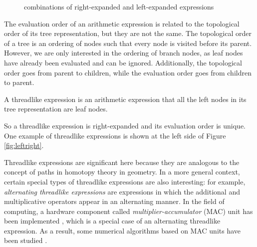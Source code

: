 \begin{figure}[ht]
\centering
{}
\caption{combinations of right-expanded and left-expanded expressions}\label{fig:combination}
\end{figure}

The evaluation order of an arithmetic expression is related to the topological order of its tree representation,
but they are not the same. The topological order of a tree is an ordering of nodes such that every node is visited before its parent\cite{Knuth1997TheAO}.
However, we are only interested in the ordering of branch nodes, as leaf nodes have already been evaluated and can be ignored.
Additionally, the topological order goes from parent to children, while the evaluation order goes from children to parent.

\begin{definition}
A threadlike expression is an arithmetic expression that all the left nodes in its tree representation are leaf nodes.
\end{definition}

So a threadlike expression is right-expanded and its evaluation order is unique.
One example of threadlike expressions is shown at the left side of Figure \ref{fig:leftright}.

Threadlike expressions are significant here because they are analogous to the concept of paths in homotopy theory in geometry.
In a more general context, certain special types of threadlike expressions are also interesting:
for example, \emph{alternating threadlike expressions} are expressions in which the additional and multiplicative operators appear in an alternating manner.
In the field of computing, a hardware component called \emph{multiplier-accumulator} (MAC) unit has been implemented \cite{Quinnell2007FloatingPointFM},
which is a special case of an alternating threadlike expression.
As a result, some numerical algorithms based on MAC units have been studied \cite{Markstein2004SoftwareDA}.


